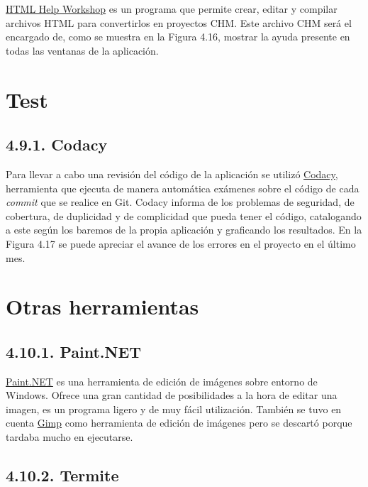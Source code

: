 \href{https://www.microsoft.com/en-us/download/details.aspx?id=21138}{HTML Help Workshop} es un programa que permite crear, editar y compilar archivos HTML para convertirlos en proyectos CHM. Este archivo CHM será el encargado de, como se muestra en la Figura 4.16, mostrar la ayuda presente en todas las ventanas de la aplicación.


\section{Test}

\subsection{4.9.1. Codacy}

Para llevar a cabo una revisión del código de la aplicación se utilizó \href{https://www.codacy.com/}{Codacy}, herramienta que ejecuta de manera automática exámenes sobre el código de cada \textit{commit} que se realice en Git. Codacy informa de los problemas de seguridad, de cobertura, de duplicidad y de complicidad que pueda tener el código, catalogando a este según los baremos de la propia aplicación y graficando los resultados. En la Figura 4.17 se puede apreciar el avance de los errores en el proyecto en el último mes.


\section{Otras herramientas}

\subsection{4.10.1. Paint.NET}

\href{https://www.getpaint.net/index.html}{Paint.NET} es una herramienta de edición de imágenes sobre entorno de Windows. Ofrece una gran cantidad de posibilidades a la hora de editar una imagen, es un programa ligero y de muy fácil utilización. También se tuvo en cuenta \href{http://www.gimp.org.es/}{Gimp} como herramienta de edición de imágenes pero se descartó porque tardaba mucho en ejecutarse.

\subsection{4.10.2. Termite}

